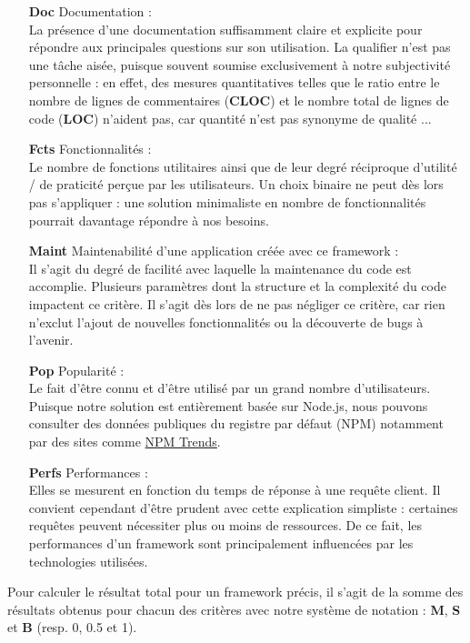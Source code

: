 \begin{itemize}
    \item[\textbf{Doc}] Documentation : \\
    La présence d'une documentation suffisamment claire et explicite pour répondre aux principales questions sur son utilisation.
    La qualifier n'est pas une tâche aisée, puisque souvent soumise exclusivement à notre subjectivité personnelle : en effet, des mesures quantitatives telles que le ratio entre le nombre de lignes de commentaires (\textbf{CLOC}) et le nombre total de lignes de code (\textbf{LOC}) n'aident pas, car quantité n'est pas synonyme de qualité ... 
    \item[\textbf{Fcts}] Fonctionnalités : \\
    Le nombre de fonctions utilitaires ainsi que de leur degré réciproque d'utilité / de praticité perçue par les utilisateurs. Un choix binaire ne peut dès lors pas s'appliquer : une solution minimaliste en nombre de fonctionnalités pourrait davantage répondre à nos besoins.
    \item[\textbf{Maint}] Maintenabilité d'une application créée avec ce framework : \\
    Il s'agit du degré de facilité avec laquelle la maintenance du code est accomplie. Plusieurs paramètres dont la structure et la complexité du code impactent ce critère. Il s'agit dès lors de ne pas négliger ce critère, car rien n'exclut l'ajout de nouvelles fonctionnalités ou la découverte de bugs à l'avenir.
    \item[\textbf{Pop}] Popularité : \\
    Le fait d'être connu et d'être utilisé par un grand nombre d'utilisateurs.
    Puisque notre solution est entièrement basée sur Node.js, nous pouvons consulter des données publiques du registre par défaut (NPM) notamment par des sites comme \href{https://www.npmtrends.com/}{NPM Trends}.
    \item[\textbf{Perfs}] Performances : \\
    Elles se mesurent en fonction du temps de réponse à une requête client.
    Il convient cependant d'être prudent avec cette explication simpliste : certaines requêtes peuvent nécessiter plus ou moins de ressources.
    De ce fait, les performances d'un framework sont principalement influencées par les technologies utilisées. 
\end{itemize}

Pour calculer le résultat total pour un framework précis, il s'agit de la somme des résultats obtenus pour chacun des critères avec notre système de notation : \textbf{M}, \textbf{S} et \textbf{B} (resp. 0, 0.5 et 1).

